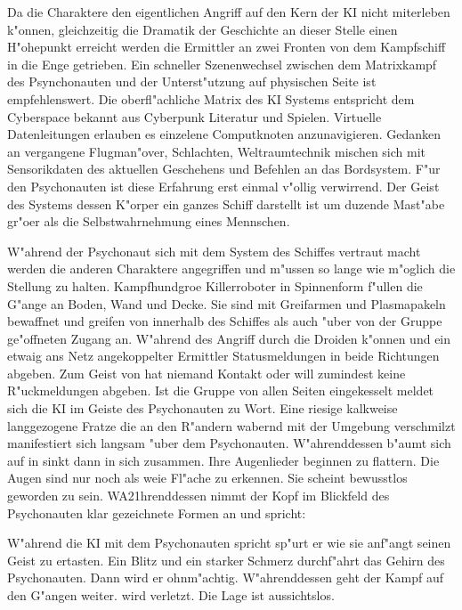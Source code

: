 Da die Charaktere den eigentlichen Angriff auf den Kern der KI nicht miterleben k"onnen, gleichzeitig die Dramatik der Geschichte an dieser Stelle einen H"ohepunkt erreicht werden die Ermittler an zwei Fronten von dem Kampfschiff in die Enge getrieben. Ein schneller Szenenwechsel zwischen dem Matrixkampf des Psynchonauten und der Unterst"utzung auf physischen Seite ist empfehlenswert. Die oberfl"achliche Matrix des KI Systems entspricht dem Cyberspace bekannt aus Cyberpunk Literatur und Spielen. Virtuelle Datenleitungen erlauben es einzelene Computknoten anzunavigieren. Gedanken an vergangene Flugman"over, Schlachten, Weltraumtechnik mischen sich mit Sensorikdaten des aktuellen Geschehens und Befehlen an das Bordsystem. F"ur den Psychonauten ist diese Erfahrung erst einmal v"ollig verwirrend. Der Geist des Systems dessen K"orper ein ganzes Schiff darstellt ist um duzende Ma\3st"abe gr"o\3er als die Selbstwahrnehmung eines Mennschen.

W"ahrend der Psychonaut sich mit dem System des Schiffes vertraut macht werden die anderen Charaktere angegriffen und m"ussen so lange wie m"oglich die Stellung zu halten. Kampfhundgro\3e Killerroboter in Spinnenform f"ullen die G"ange an Boden, Wand und Decke. Sie sind mit Greifarmen und Plasmapakeln bewaffnet und greifen von innerhalb des Schiffes als auch "uber von der Gruppe ge"offneten Zugang an. W"ahrend des Angriff durch die Droiden k"onnen \ml{} und ein etwaig ans Netz angekoppelter Ermittler Statusmeldungen in beide Richtungen abgeben. Zum Geist von \xl{} hat niemand Kontakt oder \ml{} will zumindest keine R"uckmeldungen abgeben. Ist die Gruppe von allen Seiten eingekesselt meldet sich die KI im Geiste des Psychonauten zu Wort. Eine riesige kalkweise langgezogene Fratze die an den R"andern wabernd mit der Umgebung verschmilzt manifestiert sich langsam "uber dem Psychonauten. W"ahrenddessen b"aumt sich \xl{} auf in sinkt dann in sich zusammen. Ihre Augenlieder beginnen zu flattern. Die Augen sind nur noch als wei\3e Fl"ache zu erkennen. Sie scheint bewusstlos geworden zu sein. WA21hrenddessen nimmt der Kopf im Blickfeld des Psychonauten klar gezeichnete Formen an und spricht:


W"ahrend die KI mit dem Psychonauten spricht sp"urt er wie sie anf"angt seinen Geist zu ertasten. Ein Blitz und ein starker Schmerz durchf"ahrt das Gehirn des Psychonauten. Dann wird er ohnm"achtig. W"ahrenddessen geht der Kampf auf den G"angen weiter. \ml{} wird verletzt. Die Lage ist aussichtslos.

